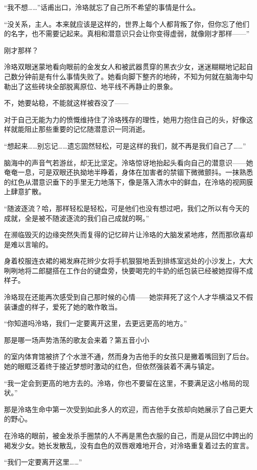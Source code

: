 \documentclass[UTF8, scheme = chinese, openany]{ctexbook}
\begin{document}
“我不想……”话甫出口，泠珞就忘了自己所不希望的事情是什么。

“没关系，主人。本来就应该是这样的，世界上每个人都背叛了你，但你忘了他们的名字，也不需要记起来。真相和潜意识只会让你变得虚弱，就像刚才那样——”

刚才那样？

泠珞双眼迷蒙地看向眼前的金发女人和被武器贯穿的黑衣少女，迷迷糊糊地记起自己数分钟前是有什么事情失败了。她看向脚下整齐的地砖，不知为何就在脑海中勾勒出了这些砖块全部脱离原位、地平线不再静止的景象。

不，她要站稳，不能就这样被吞没了——

对于自己无能为力的愤慨维持住了泠珞残存的理性，她用力抱住自己的头，好像这样就能阻止那些重要的记忆随潜意识一同消逝。

“想起来……别忘记……遗忘固然轻松，可是这样的我们，就不再是我们自己了……”

脑海中的声音气若游丝，却无比坚定。泠珞惊讶地抬起头看向自己的潜意识——她奄奄一息，可是双眼还执拗地半睁着，身体在加害者的禁锢下微微颤抖。一抹熟悉的红色从潜意识垂下的手里无力地落下，像是落入清水中的鲜血，在泠珞的视网膜上肆意扩散。

“随波逐流？哈，那样轻松是轻松，可是他们也没有想过吧，我们之所以有今天的成就，全是被不随波逐流的我们自己成就的啊。”

在濒临毁灭的边缘突然失而复得的记忆碎片让泠珞的大脑发紧地疼，然而那欣喜却是难以言喻的。

身着校服连衣裙的褐发麻花辫少女将手机狠狠地丢到排练室远处的小沙发上，大大咧咧地将二郎腿搭在工作台的键盘旁，快要喝完的牛奶的纸包装已经被她捏得不成样子。

泠珞现在还能再次感受到自己那时候的心情——她崇拜死了这个人才华横溢又不假装谦虚的样子，爱死了她的敢作敢当。

“你知道吗泠珞，我们一定要离开这里，去更远更高的地方。”

那是哪一场声势浩荡的歌友会来着？第五音小小

的室内体育馆被挤了个水泄不通，然而身为吉他手的女孩只是撇着嘴回到了后台。她的眼眶泛着终于接近梦想时激动的红色，但依然强装着不满与镇定。

“我一定会到更高的地方去的。泠珞，你也不要留在这里，不要满足这小格局的现状。”

那是泠珞生命中第一次受到如此多人的欢迎，而吉他手女孩却向她展示了自己更大的野心。

在泠珞的眼前，被金发杀手圈禁的人不再是黑色衣服的自己，而是从回忆中跨出的褐发少女。她长发散乱，没有血色的双唇艰难地开合，对泠珞重复着过去的宣言。

“我们一定要离开这里……”
\end{document}
